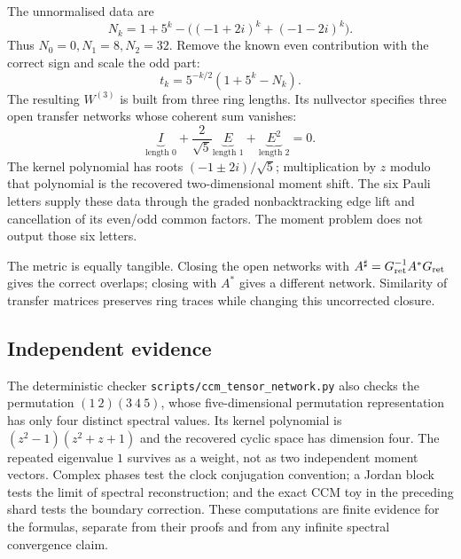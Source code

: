 The unnormalised data are
\[
 N_k=1+5^k-\bigl((-1+2i)^k+(-1-2i)^k\bigr).
\]
Thus $N_0=0,N_1=8,N_2=32$. Remove the known even contribution with
the correct sign and scale the odd part:
\[
 t_k=5^{-k/2}(1+5^k-N_k).
\]
The resulting $W^{(3)}$ is built from three ring lengths. Its nullvector
specifies three open transfer networks whose coherent sum vanishes:
\[
 \underbrace{I}_{\text{length }0}
 +\frac2{\sqrt5}\underbrace{E}_{\text{length }1}
 +\underbrace{E^2}_{\text{length }2}=0.
\]
The kernel polynomial has roots $(-1\pm2i)/\sqrt5$; multiplication
by $z$ modulo that polynomial is the recovered two-dimensional moment
shift. The six Pauli letters supply these data through the graded
nonbacktracking edge lift and cancellation of its even/odd common
factors. The moment problem does not output those six letters.

The metric is equally tangible. Closing the open networks with
$A^\sharp=G_{\mathrm{ret}}^{-1}A^*G_{\mathrm{ret}}$ gives the correct overlaps;
closing with $A^*$ gives a different network. Similarity of transfer
matrices preserves ring traces while changing this uncorrected closure.

\subsection{Independent evidence}

The deterministic checker \texttt{scripts/ccm\_tensor\_network.py}
also checks the permutation $(1\ 2)(3\ 4\ 5)$, whose five-dimensional
permutation representation has only four distinct spectral values.
Its kernel polynomial is $(z^2-1)(z^2+z+1)$ and the recovered cyclic
space has dimension four. The repeated eigenvalue $1$ survives as a
weight, not as two independent moment vectors.
Complex phases test the clock conjugation convention; a Jordan block
tests the limit of spectral reconstruction; and the exact CCM toy in
the preceding shard tests the boundary correction.
These computations are finite evidence for the formulas, separate from
their proofs and from any infinite spectral convergence claim.

